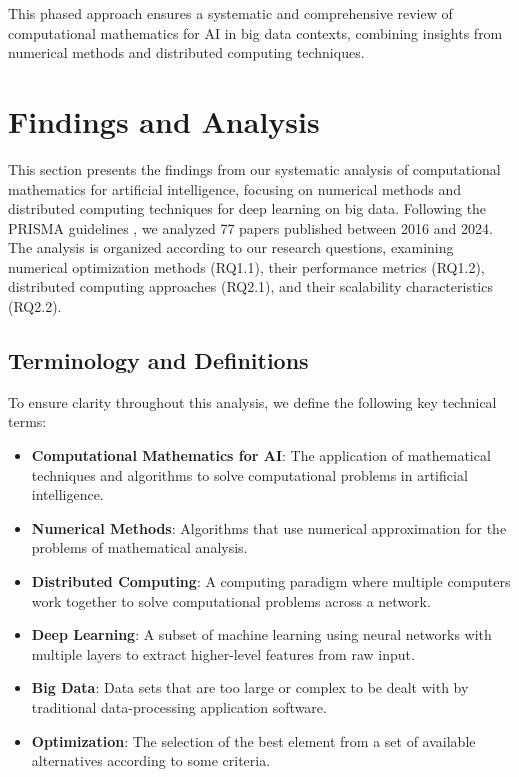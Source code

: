 \documentclass[a4paper,12pt]{acm/acmart}
\begin{document}
This phased approach ensures a systematic and comprehensive review of computational mathematics for AI in big data contexts, combining insights from numerical methods and distributed computing techniques.

\section{Findings and Analysis}\label{sec:findings-and-analysis}
This section presents the findings from our systematic analysis of computational mathematics for artificial intelligence, focusing on numerical methods and distributed computing techniques for deep learning on big data. Following the PRISMA guidelines \citep{moher2009preferred}, we analyzed 77 papers published between 2016 and 2024. The analysis is organized according to our research questions, examining numerical optimization methods (RQ1.1), their performance metrics (RQ1.2), distributed computing approaches (RQ2.1), and their scalability characteristics (RQ2.2).

\subsection{Terminology and Definitions}\label{subsec:terminology-and-definitions}
To ensure clarity throughout this analysis, we define the following key technical terms:
\begin{itemize}
    \item \textbf{Computational Mathematics for AI}: The application of mathematical techniques and algorithms to solve computational problems in artificial intelligence.
    \item \textbf{Numerical Methods}: Algorithms that use numerical approximation for the problems of mathematical analysis.
    \item \textbf{Distributed Computing}: A computing paradigm where multiple computers work together to solve computational problems across a network.
    \item \textbf{Deep Learning}: A subset of machine learning using neural networks with multiple layers to extract higher-level features from raw input.
    \item \textbf{Big Data}: Data sets that are too large or complex to be dealt with by traditional data-processing application software.
    \item \textbf{Optimization}: The selection of the best element from a set of available alternatives according to some criteria.
\end{itemize}
\end{document}
